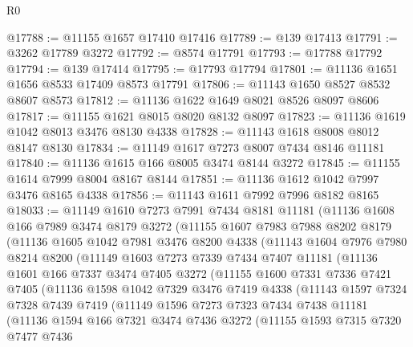 \begin{lexlean}{R0}
\begin{coremodule}
@17788 := @11155 @1657 @17410 @17416
@17789 := @139 @17413
@17791 := @3262 @17789 @3272
@17792 := @8574 @17791
@17793 := @17788 @17792
@17794 := @139 @17414
@17795 := @17793 @17794
@17801 := @11136 @1651 @1656 @8533 @17409 @8573 @17791
@17806 := @11143 @1650 @8527 @8532 @8607 @8573
@17812 := @11136 @1622 @1649 @8021 @8526 @8097 @8606
@17817 := @11155 @1621 @8015 @8020 @8132 @8097
@17823 := @11136 @1619 @1042 @8013 @3476 @8130 @4338
@17828 := @11143 @1618 @8008 @8012 @8147 @8130
@17834 := @11149 @1617 @7273 @8007 @7434 @8146 @11181
@17840 := @11136 @1615 @166 @8005 @3474 @8144 @3272
@17845 := @11155 @1614 @7999 @8004 @8167 @8144
@17851 := @11136 @1612 @1042 @7997 @3476 @8165 @4338
@17856 := @11143 @1611 @7992 @7996 @8182 @8165
@18033 := @11149
    @1610
    @7273
    @7991
    @7434
    @8181
    @11181
    (@11136
      @1608
      @166
      @7989
      @3474
      @8179
      @3272
      (@11155
        @1607
        @7983
        @7988
        @8202
        @8179
        (@11136
          @1605
          @1042
          @7981
          @3476
          @8200
          @4338
          (@11143
            @1604
            @7976
            @7980
            @8214
            @8200
            (@11149
              @1603
              @7273
              @7339
              @7434
              @7407
              @11181
              (@11136
                @1601
                @166
                @7337
                @3474
                @7405
                @3272
                (@11155
                  @1600
                  @7331
                  @7336
                  @7421
                  @7405
                  (@11136
                    @1598
                    @1042
                    @7329
                    @3476
                    @7419
                    @4338
                    (@11143
                      @1597
                      @7324
                      @7328
                      @7439
                      @7419
                      (@11149
                        @1596
                        @7273
                        @7323
                        @7434
                        @7438
                        @11181
                        (@11136
                          @1594
                          @166
                          @7321
                          @3474
                          @7436
                          @3272
                          (@11155
                            @1593
                            @7315
                            @7320
                            @7477
                            @7436

\end{coremodule}
\end{lexlean}
